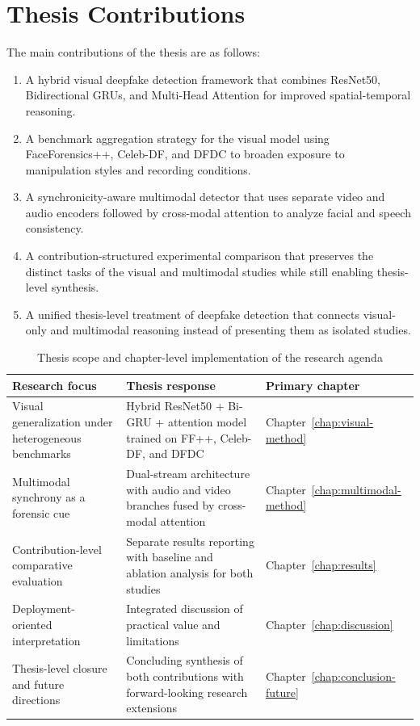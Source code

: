 \section{Thesis Contributions}

The main contributions of the thesis are as follows:
\begin{enumerate}[label=\arabic*.]
    \item A hybrid visual deepfake detection framework that combines ResNet50, Bidirectional GRUs, and Multi-Head Attention for improved spatial-temporal reasoning.
    \item A benchmark aggregation strategy for the visual model using FaceForensics++, Celeb-DF, and DFDC to broaden exposure to manipulation styles and recording conditions.
    \item A synchronicity-aware multimodal detector that uses separate video and audio encoders followed by cross-modal attention to analyze facial and speech consistency.
    \item A contribution-structured experimental comparison that preserves the distinct tasks of the visual and multimodal studies while still enabling thesis-level synthesis.
    \item A unified thesis-level treatment of deepfake detection that connects visual-only and multimodal reasoning instead of presenting them as isolated studies.
\end{enumerate}

\begin{table}[H]
\centering
\small
\caption{Thesis scope and chapter-level implementation of the research agenda}
\label{tab:thesis-scope}
\begin{tabular}{p{}p{}p{}}
\toprule
\textbf{Research focus} & \textbf{Thesis response} & \textbf{Primary chapter} \\
\midrule
Visual generalization under heterogeneous benchmarks & Hybrid ResNet50 + Bi-GRU + attention model trained on FF++, Celeb-DF, and DFDC & Chapter~\ref{chap:visual-method} \\
Multimodal synchrony as a forensic cue & Dual-stream architecture with audio and video branches fused by cross-modal attention & Chapter~\ref{chap:multimodal-method} \\
Contribution-level comparative evaluation & Separate results reporting with baseline and ablation analysis for both studies & Chapter~\ref{chap:results} \\
Deployment-oriented interpretation & Integrated discussion of practical value and limitations & Chapter~\ref{chap:discussion} \\
Thesis-level closure and future directions & Concluding synthesis of both contributions with forward-looking research extensions & Chapter~\ref{chap:conclusion-future} \\
\bottomrule
\end{tabular}
\end{table}

